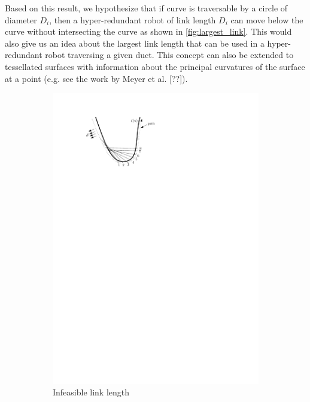 \documentclass[12pt,a4]{article}
\begin{document}
Based on this result, we hypothesize that if curve is traversable by a circle of diameter $D_i$, then a hyper-redundant robot of link length $D_i$ can move below the curve without intersecting the curve as shown in \cref{fig:largest_link}. This would also give us an idea about the largest link length that can be used in a hyper-redundant robot traversing a given duct. This concept can also be extended to tessellated surfaces with information about the principal curvatures of the surface at a point (e.g. see the work by Meyer et al. [??]). 
\begin{figure}[ht!]
	\centering
		\begin{subfigure}{0.31\textwidth}
		\centering
		\includegraphics[width=1.15\linewidth]{figures/Traversabilityproblem.pdf}
		\caption{Infeasible link length\label{fig:not_traversable}}
	\end{subfigure}%
	\begin{subfigure}{0.31\textwidth}

\end{subfigure}
\end{figure}
\end{document}
